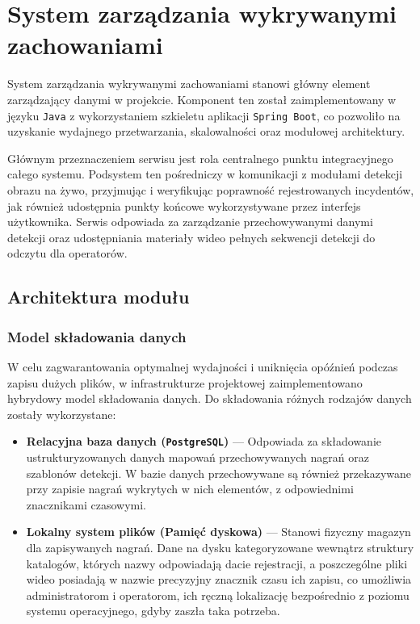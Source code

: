 \chapter{System zarządzania wykrywanymi zachowaniami}
System zarządzania wykrywanymi zachowaniami stanowi główny element 
zarządzający danymi w projekcie. Komponent ten został zaimplementowany w języku \texttt{Java} z 
wykorzystaniem szkieletu aplikacji \texttt{Spring Boot}, co pozwoliło na uzyskanie wydajnego przetwarzania, 
skalowalności oraz modułowej architektury.

Głównym przeznaczeniem serwisu jest rola centralnego punktu integracyjnego całego systemu. 
Podsystem ten pośredniczy w komunikacji z modułami detekcji obrazu na żywo, 
przyjmując i weryfikując poprawność rejestrowanych incydentów, jak również udostępnia 
punkty końcowe wykorzystywane przez interfejs użytkownika. Serwis odpowiada za 
zarządzanie przechowywanymi danymi detekcji oraz udostępniania materiały wideo pełnych 
sekwencji detekcji do odczytu dla operatorów.

\section{Architektura modułu}

\subsection{Model składowania danych}
W celu zagwarantowania optymalnej wydajności i uniknięcia opóźnień podczas 
zapisu dużych plików, w infrastrukturze projektowej zaimplementowano hybrydowy model 
składowania danych. Do składowania różnych rodzajów danych zostały wykorzystane:
\begin{itemize}
    \item \textbf{Relacyjna baza danych (\texttt{PostgreSQL})} --- Odpowiada za składowanie ustrukturyzowanych danych mapowań przechowywanych nagrań oraz szablonów detekcji. W bazie danych przechowywane są również przekazywane przy zapisie nagrań wykrytych w nich elementów, z odpowiednimi znacznikami czasowymi.
    \item \textbf{Lokalny system plików (Pamięć dyskowa)} --- Stanowi fizyczny magazyn dla zapisywanych nagrań. Dane na dysku kategoryzowane wewnątrz struktury katalogów, których nazwy odpowiadają dacie rejestracji, a poszczególne pliki wideo posiadają w nazwie precyzyjny znacznik czasu ich zapisu, co umożliwia administratorom i operatorom, ich ręczną lokalizację bezpośrednio z poziomu systemu operacyjnego, gdyby zaszła taka potrzeba.
\end{itemize}

